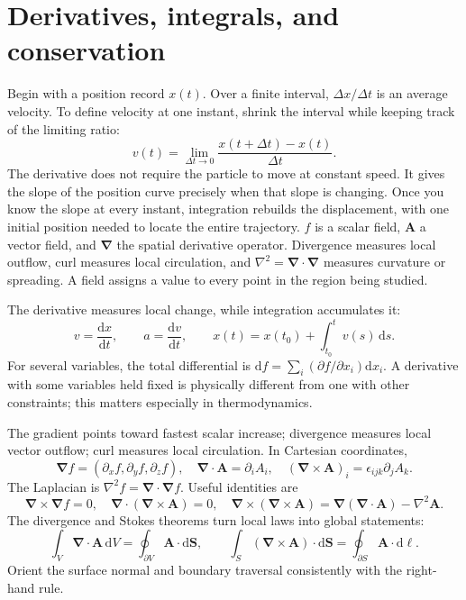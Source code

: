\documentclass[11pt,oneside]{book}
\newcommand{\dd}{\mathrm{d}}
\newcommand{\vect}[1]{\boldsymbol{#1}}
\newcommand{\grad}{\boldsymbol{\nabla}}
\newcommand{\lap}{\nabla^2}
\newcommand{\od}[2]{\frac{\dd #1}{\dd #2}}
\theoremstyle{reviewstyle}
\begin{document}
\section{Derivatives, integrals, and conservation}
Begin with a position record $x(t)$. Over a finite interval, $\Delta x/\Delta t$ is an average velocity. To define velocity at one instant, shrink the interval while keeping track of the limiting ratio:
\begin{equation}
v(t)=\lim_{\Delta t\to0}\frac{x(t+\Delta t)-x(t)}{\Delta t}.
\end{equation}
The derivative does not require the particle to move at constant speed. It gives the slope of the position curve precisely when that slope is changing. Once you know the slope at every instant, integration rebuilds the displacement, with one initial position needed to locate the entire trajectory. $f$ is a scalar field, $\vect A$ a vector field, and $\grad$ the spatial derivative operator. Divergence measures local outflow, curl measures local circulation, and $\lap=\grad\cdot\grad$ measures curvature or spreading. A field assigns a value to every point in the region being studied.

The derivative measures local change, while integration accumulates it:
\begin{equation}
v=\od{x}{t},\qquad a=\od{v}{t},\qquad x(t)=x(t_0)+\int_{t_0}^t v(s)\,\dd s.
\end{equation}
For several variables, the total differential is $\dd f=\sum_i(\partial f/\partial x_i)\dd x_i$. A derivative with some variables held fixed is physically different from one with other constraints; this matters especially in thermodynamics.

The gradient points toward fastest scalar increase; divergence measures local vector outflow; curl measures local circulation. In Cartesian coordinates,
\begin{equation}
\grad f=(\partial_xf,\partial_yf,\partial_zf),\quad
\grad\cdot\vect A=\partial_iA_i,\quad
(\grad\times\vect A)_i=\epsilon_{ijk}\partial_jA_k.
\end{equation}
The Laplacian is $\lap f=\grad\cdot\grad f$. Useful identities are
\begin{equation}
\grad\times\grad f=0,\quad \grad\cdot(\grad\times\vect A)=0,\quad
\grad\times(\grad\times\vect A)=\grad(\grad\cdot\vect A)-\lap\vect A.
\end{equation}
The divergence and Stokes theorems turn local laws into global statements:
\begin{equation}
\int_V\grad\cdot\vect A\,\dd V=\oint_{\partial V}\vect A\cdot\dd\vect S,
\qquad
\int_S(\grad\times\vect A)\cdot\dd\vect S=\oint_{\partial S}\vect A\cdot\dd\vect\ell.
\end{equation}
Orient the surface normal and boundary traversal consistently with the right-hand rule.
\end{document}
